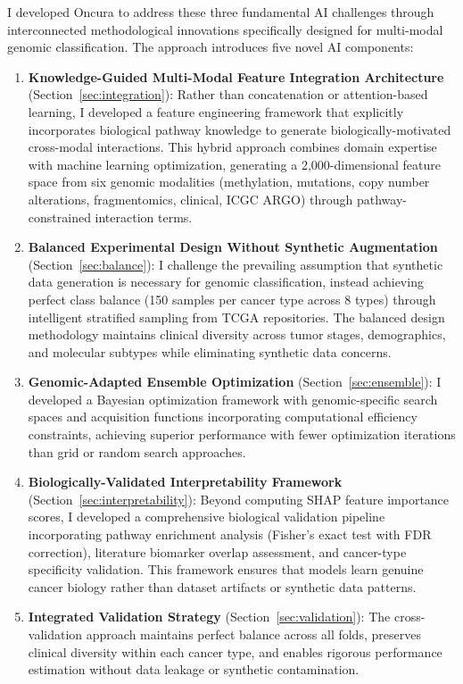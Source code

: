 \documentclass[manuscript, screen, review]{jair}
\begin{document}
I developed Oncura to address these three fundamental AI challenges through interconnected methodological innovations specifically designed for multi-modal genomic classification. The approach introduces five novel AI components:

\begin{enumerate}
  \item \textbf{Knowledge-Guided Multi-Modal Feature Integration Architecture} (Section~\ref{sec:integration}): Rather than concatenation or attention-based learning, I developed a feature engineering framework that explicitly incorporates biological pathway knowledge to generate biologically-motivated cross-modal interactions. This hybrid approach combines domain expertise with machine learning optimization, generating a 2,000-dimensional feature space from six genomic modalities (methylation, mutations, copy number alterations, fragmentomics, clinical, ICGC ARGO) through pathway-constrained interaction terms.
  \item \textbf{Balanced Experimental Design Without Synthetic Augmentation} (Section~\ref{sec:balance}): I challenge the prevailing assumption that synthetic data generation is necessary for genomic classification, instead achieving perfect class balance (150 samples per cancer type across 8 types) through intelligent stratified sampling from TCGA repositories. The balanced design methodology maintains clinical diversity across tumor stages, demographics, and molecular subtypes while eliminating synthetic data concerns.
  \item \textbf{Genomic-Adapted Ensemble Optimization} (Section~\ref{sec:ensemble}): I developed a Bayesian optimization framework with genomic-specific search spaces and acquisition functions incorporating computational efficiency constraints, achieving superior performance with fewer optimization iterations than grid or random search approaches.
  \item \textbf{Biologically-Validated Interpretability Framework} (Section~\ref{sec:interpretability}): Beyond computing SHAP feature importance scores, I developed a comprehensive biological validation pipeline incorporating pathway enrichment analysis (Fisher's exact test with FDR correction), literature biomarker overlap assessment, and cancer-type specificity validation. This framework ensures that models learn genuine cancer biology rather than dataset artifacts or synthetic data patterns.
  \item \textbf{Integrated Validation Strategy} (Section~\ref{sec:validation}): The cross-validation approach maintains perfect balance across all folds, preserves clinical diversity within each cancer type, and enables rigorous performance estimation without data leakage or synthetic contamination.
\end{enumerate}
\end{document}

